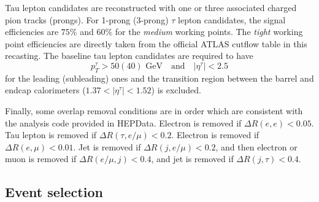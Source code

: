 \documentclass{ws-mpla}
\begin{document}
Tau lepton candidates are reconstructed with one or three associated charged pion tracks (prongs). %
For 1-prong (3-prong) $\tau$ lepton candidates, the signal efficiencies are $75\%$ and $60\%$ for the \textit{medium} working points. 
{\color{blue}The \textit{tight} working point efficiencies are directly taken from the official ATLAS cutflow table in this recasting.}
The baseline tau lepton candidates are required to have 
\begin{equation}
p^{\tau}_T > 50(40) \textrm{ GeV}\quad \textrm{and}\quad |\eta^{\tau}| < 2.5
\end{equation}
for the leading (subleading) ones and the transition region between the barrel and endcap calorimeters ($ 1.37 < |\eta^{\tau}| < 1.52 $) is excluded.

Finally, some overlap removal conditions are in order which are consistent with the analysis code provided in HEPData\cite{hepdata}. Electron is removed if $\Delta R(e,e) < 0.05$. Tau lepton is removed if $\Delta R(\tau,e/\mu) < 0.2$. Electron is removed if $\Delta R(e,\mu) < 0.01$. Jet is removed if $\Delta R(j,e/\mu) < 0.2$, and then electron or muon is removed if $\Delta R(e/\mu,j) < 0.4$, and jet is removed if $\Delta R(j,\tau) < 0.4$.


\subsection{Event selection}
\end{document}

